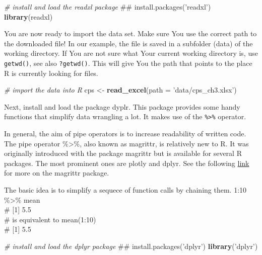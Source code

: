 \documentclass[]{book}
\newenvironment{Shaded}{\begin{snugshade}}{\end{snugshade}}
\newcommand{\KeywordTok}[1]{\textcolor[rgb]{0.13,0.29,0.53}{\textbf{#1}}}
\newcommand{\DataTypeTok}[1]{\textcolor[rgb]{0.13,0.29,0.53}{#1}}
\newcommand{\StringTok}[1]{\textcolor[rgb]{0.31,0.60,0.02}{#1}}
\newcommand{\CommentTok}[1]{\textcolor[rgb]{0.56,0.35,0.01}{\textit{#1}}}
\newcommand{\NormalTok}[1]{#1}
\theoremstyle{definition}
\theoremstyle{definition}
\theoremstyle{definition}
\theoremstyle{remark}
\let\BeginKnitrBlock\begin \let\EndKnitrBlock\end
\begin{document}
\begin{Shaded}
\begin{Highlighting}[]
\CommentTok{# install and load the readxl package}
\NormalTok{## install.packages('readxl')}
\KeywordTok{library}\NormalTok{(readxl)}
\end{Highlighting}
\end{Shaded}

You are now ready to import the data set. Make sure You use the correct
path to the downloaded file! In our example, the file is saved in a
subfolder (data) of the working directory. If You are not sure what Your
current working directory is, use \texttt{getwd()}, see also
\texttt{?getwd()}. This will give You the path that points to the place
R is currently looking for files.

\begin{Shaded}
\begin{Highlighting}[]
\CommentTok{# import the data into R}
\NormalTok{cps <-}\StringTok{ }\KeywordTok{read_excel}\NormalTok{(}\DataTypeTok{path =} \StringTok{'data/cps_ch3.xlsx'}\NormalTok{)}
\end{Highlighting}
\end{Shaded}

Next, install and load the package dyplr. This package provides some
handy functions that simplify data wrangling a lot. It makes use of the
\texttt{\%\textgreater{}\%} operator.

\BeginKnitrBlock{rmdknit}
In general, the aim of pipe operators is to increase readability of
written code. The pipe operator \%\textgreater{}\%, also known as
magrittr, is relatively new to R. It was originally introduced with the
package magrittr but is available for several R packages. The most
prominent ones are plotly and dplyr. See the following
\href{https://cran.r-project.org/web/packages/magrittr/vignettes/magrittr.html}{link}
for more on the magrittr package.

The basic idea is to simplify a sequece of function calls by chaining
them. 1:10 \%\textgreater{}\% mean\\
\# {[}1{]} 5.5\\
 \# is equivalent to mean(1:10)\\
\# {[}1{]} 5.5
\EndKnitrBlock{rmdknit}

\begin{Shaded}
\begin{Highlighting}[]
\CommentTok{# install and load the dplyr package}
\NormalTok{## install.packages('dplyr')}
\KeywordTok{library}\NormalTok{(}\StringTok{'dplyr'}\NormalTok{)}
\end{Highlighting}
\end{Shaded}
\end{document}
